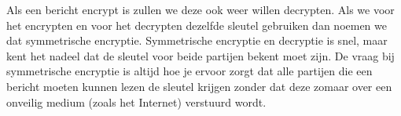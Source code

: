 Als een bericht encrypt is zullen we deze ook weer willen decrypten. Als we voor het encrypten en voor het decrypten dezelfde sleutel gebruiken dan noemen we dat symmetrische encryptie. Symmetrische encryptie en decryptie is snel, maar kent het nadeel dat de sleutel voor beide partijen bekent moet zijn. De vraag bij symmetrische encryptie is altijd hoe je ervoor zorgt dat alle partijen die een bericht moeten kunnen lezen de sleutel krijgen zonder dat deze zomaar over een onveilig medium (zoals het Internet) verstuurd wordt.
